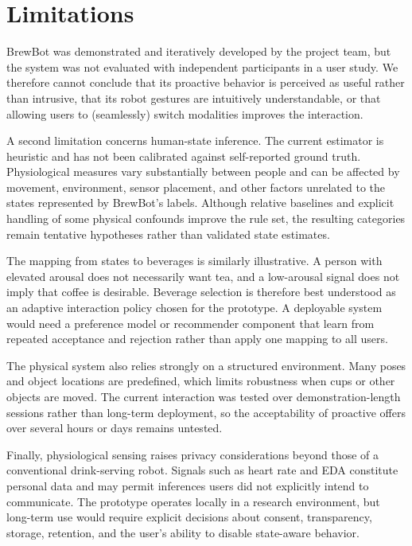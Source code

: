 \section{Limitations}

BrewBot was demonstrated and iteratively developed by the project team, but 
the system was not evaluated with independent participants in a user study. 
We therefore cannot conclude that its proactive behavior is perceived as 
useful rather than intrusive, that its robot gestures are intuitively 
understandable, or that allowing users to (seamlessly) switch modalities 
improves the interaction.

A second limitation concerns human-state inference. The current estimator is
heuristic and has not been calibrated against self-reported ground truth.
Physiological measures vary substantially between people and can be affected by
movement, environment, sensor placement, and other factors unrelated to the
states represented by BrewBot's labels. Although relative baselines and explicit
handling of some physical confounds improve the rule set, the resulting
categories remain tentative hypotheses rather than validated state estimates.

The mapping from states to beverages is similarly illustrative. A person with
elevated arousal does not necessarily want tea, and a low-arousal signal does
not imply that coffee is desirable. Beverage selection is therefore best
understood as an adaptive interaction policy chosen for the prototype. A
deployable system would need a preference model or recommender component that 
learn from repeated acceptance and rejection rather than apply one mapping to 
all users.

The physical system also relies strongly on a structured environment. Many
poses and object locations are predefined, which limits robustness when cups or
other objects are moved. The current interaction was tested over
demonstration-length sessions rather than long-term deployment, so the
acceptability of proactive offers over several hours or days remains untested.

Finally, physiological sensing raises privacy considerations beyond those of a
conventional drink-serving robot. Signals such as heart rate and EDA constitute
personal data and may permit inferences users did not explicitly intend to
communicate. The prototype operates locally in a research environment, but
long-term use would require explicit decisions about consent, transparency,
storage, retention, and the user's ability to disable state-aware behavior.

